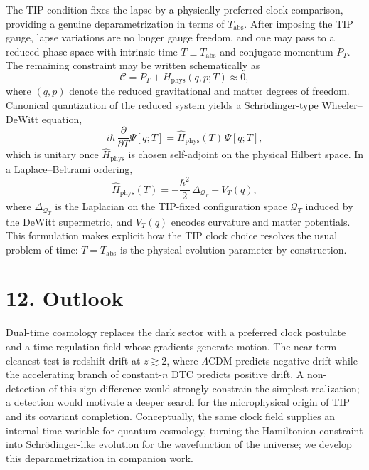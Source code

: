 \documentclass[12pt]{article}
\begin{document}
The TIP condition fixes the lapse by a physically preferred clock comparison,
providing a genuine deparametrization in terms of $T_{\mathrm{abs}}$. After imposing
the TIP gauge, lapse variations are no longer gauge freedom, and one may pass to a
reduced phase space with intrinsic time $T \equiv T_{\mathrm{abs}}$ and conjugate
momentum $P_{T}$. The remaining constraint may be written schematically as
\begin{equation}
\mathcal{C}
= P_{T} + H_{\mathrm{phys}}(q,p;T) \approx 0 ,
\end{equation}
where $(q,p)$ denote the reduced gravitational and matter degrees of freedom.
Canonical quantization of the reduced system yields a Schrödinger-type
Wheeler--DeWitt equation,
\begin{equation}
i\hbar\,\frac{\partial}{\partial T}\Psi[q;T]
= \hat{H}_{\mathrm{phys}}(T)\,\Psi[q;T] ,
\end{equation}
which is unitary once $\hat{H}_{\mathrm{phys}}$ is chosen self-adjoint on the
physical Hilbert space. In a Laplace--Beltrami ordering,
\begin{equation}
\hat{H}_{\mathrm{phys}}(T)
= -\frac{\hbar^{2}}{2}\,\Delta_{\mathcal{Q}_{T}} + V_{T}(q) ,
\end{equation}
where $\Delta_{\mathcal{Q}_{T}}$ is the Laplacian on the TIP-fixed configuration
space $\mathcal{Q}_{T}$ induced by the DeWitt supermetric, and $V_{T}(q)$ encodes
curvature and matter potentials. This formulation makes explicit how the TIP clock choice resolves the usual
problem of time: $T = T_{\mathrm{abs}}$ is the physical evolution parameter by
construction.

\section*{12. Outlook}
Dual-time cosmology replaces the dark sector with a preferred clock postulate and a time-regulation field whose gradients generate motion. The near-term cleanest test is redshift drift at $z\gtrsim 2$, where $\Lambda$CDM predicts negative drift while the accelerating branch of constant-$n$ DTC predicts positive drift. A non-detection of this sign difference would strongly constrain the simplest realization; a detection would motivate a deeper search for the microphysical origin of TIP and its covariant completion. Conceptually, the same clock field supplies an internal time variable for quantum cosmology, turning the Hamiltonian constraint into Schr\"odinger-like evolution for the wavefunction of the universe; we develop this deparametrization in companion work.
\end{document}
